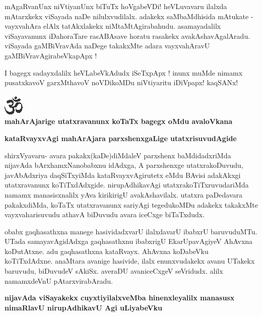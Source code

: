 \noindent
mAgaRvanUnx niVtiyanUnx biTuTx hoVgabeVDi! heVLuvavaru ilalxda mAtarxkekx viSayada naDe nilulxvudilalx. adakekx saMbaMdhisida mAtukate - vayxvahAra elAlx tatAkxlakekx niMtaMtAgirabahudu. asamayadalilx viSayavanunx iDahoraTare rasABAsave horatu rasakekx avakAshavAgalAradu. viSayada gaMBiVravAda naDege takakxMte adara vayxvahAravU gaMBiVravAgirabeVkapApx !

I bagegx sadayxdalilx heVLabeVkAdudx iSeTxpApx ! inunx muMde nimamx pusatxkavoV garxMthavoV noVDikoMDu niVtiyaritu iDiVpapx! kaqSANx!

\bigskip

\begin{center}
\includegraphics{om.eps}\\[12pt]
{\Large\bf{mahArAjarige utatxravanunx koTaTx bagegx oMdu avaloVkana}}
\end{center}

{\bigskip
\noindent
{\large\bf kataRvayxvAgi mahArAjara parxshenxgaLige utatxrisuvudAgide}}\label{page250}
\medskip

\noindent
shirxVyavaru- avara pakakx(kaDe)diMdaleV parxshenx baMdidadxriMda nijavAda bArxhamxNanobabxnu idAdxga, A parxshenxge utatxrakoDuvudu, javAbAdxriya daqSiTxyiMda kataRvayxvAgirutetx eMdu BAvisi adakAkxgi utatxravanunx koTiTxdAdxgide. nirupAdhikavAgi utatxrakoTiTxruvudariMda namamx manasisxnalilx yAva kirikirigU avakAshavilalx. utatxra paDedavara pakakxdiMda, koTaTx utatxravanunx  sariyAgi tegedukoMDu adakekx takakxMte vayxvaharisuvudu athavA biDuvudu avara iceCxge biTaTxdudx.

obabx gaqhasathxna manege hasividadxvarU ilalxdavarU ibabxrU baruvuduMTu. UTada samayavAgidAdxga gaqhasathxnu ibabxrigU EkarUpavAgiyeV AhAvxna koDutAtxne. adu gaqhasathxna kataRvayx. AhAvxna koDabeVku koTiTxdAdxne. anaMtara avanige hasivide, ilalx enunxvudakekx avanu UTakekx baruvudu, biDuvudeV sAkiSx. averaDU avaniceCxgeV seVridudx. alilx namamxdeVnU pAtarxvirabAradu.

{\bigskip
\noindent
{\large\bf nijavAda viSayakekx cuyxtiyilalxveMba hinenxleyalilx manasusx nimaRlavU nirupAdhikavU Agi uLiyabeVku}}\label{page250b}
\medskip

